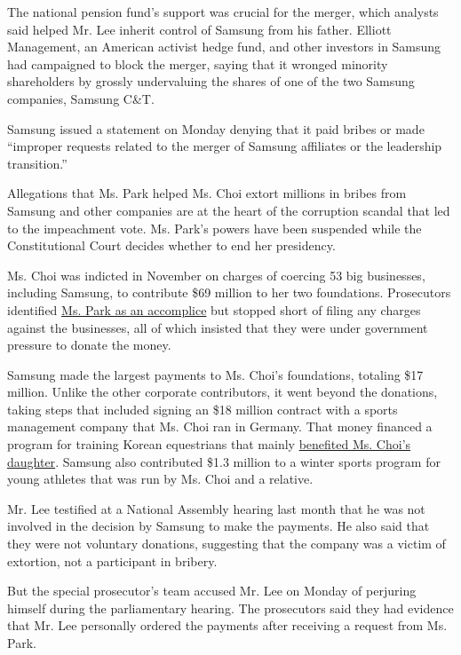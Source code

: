 The national pension fund's support was crucial for the merger, which
analysts said helped Mr. Lee inherit control of Samsung from his father.
Elliott Management, an American activist hedge fund, and other investors
in Samsung had campaigned to block the merger, saying that it wronged
minority shareholders by grossly undervaluing the shares of one of the
two Samsung companies, Samsung C\&T.

Samsung issued a statement on Monday denying that it paid bribes or made
``improper requests related to the merger of Samsung affiliates or the
leadership transition.''

Allegations that Ms. Park helped Ms. Choi extort millions in bribes from
Samsung and other companies are at the heart of the corruption scandal
that led to the impeachment vote. Ms. Park's powers have been suspended
while the Constitutional Court decides whether to end her presidency.

Ms. Choi was indicted in November on charges of coercing 53 big
businesses, including Samsung, to contribute \$69 million to her two
foundations. Prosecutors identified
\href{https://www.nytimes.com/2016/11/20/world/asia/park-geun-hye-south-korea-extortion-accomplice-prosecutors.html}{Ms.
Park as an accomplice} but stopped short of filing any charges against
the businesses, all of which insisted that they were under government
pressure to donate the money.

Samsung made the largest payments to Ms. Choi's foundations, totaling
\$17 million. Unlike the other corporate contributors, it went beyond
the donations, taking steps that included signing an \$18 million
contract with a sports management company that Ms. Choi ran in Germany.
That money financed a program for training Korean equestrians that
mainly
\href{https://www.nytimes.com/2017/01/02/world/asia/south-korea-scandal-choi-soon-sil-daughter.html}{benefited
Ms. Choi's daughter}. Samsung also contributed \$1.3 million to a winter
sports program for young athletes that was run by Ms. Choi and a
relative.

Mr. Lee testified at a National Assembly hearing last month that he was
not involved in the decision by Samsung to make the payments. He also
said that they were not voluntary donations, suggesting that the company
was a victim of extortion, not a participant in bribery.

But the special prosecutor's team accused Mr. Lee on Monday of perjuring
himself during the parliamentary hearing. The prosecutors said they had
evidence that Mr. Lee personally ordered the payments after receiving a
request from Ms. Park.

